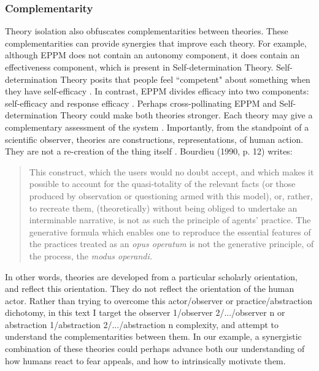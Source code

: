 \documentclass[12 pt]{article}
\begin{document}
 \subsubsection{Complementarity} 
Theory isolation also obfuscates complementarities between theories. These complementarities can provide synergies that improve each theory.  For example, although EPPM does not contain an autonomy component, it does contain an effectiveness component, which is present in Self-determination Theory. Self-determination Theory posits that people feel ``competent" about something when they have self-efficacy \parencite{Ryan2000}. In contrast, EPPM divides efficacy into two components: self-efficacy and response efficacy \parencite{Maloney2011}. Perhaps cross-pollinating EPPM and Self-determination Theory could make both theories stronger. Each theory may give a complementary assessment of the system \parencite{Weinberg2001}. Importantly, from the standpoint of a scientific observer, theories are constructions, representations, of human action. They are not a re-creation of the thing itself \parencite{Kaplan1964, Bourdieu1990}. Bourdieu (1990,  p. 12) writes: \blockquote{This construct, which the users would no doubt accept, and which makes it possible to account for the quasi-totality of the relevant facts (or those produced by observation or questioning armed with this model), or, rather, to recreate them, (theoretically) without being obliged to undertake an interminable narrative, is not as such the principle of agents' practice. The generative formula which enables one to reproduce the essential features of the practices treated as an \textit{opus operatum} is not the generative principle, of the process, the \textit{modus operandi.}}

In other words, theories are developed from a particular scholarly orientation, and reflect this orientation. They do not reflect the orientation of the human actor. Rather than trying to overcome this actor/observer or practice/abstraction  dichotomy, in this text I target the observer 1/observer 2/.../observer n   or abstraction 1/abstraction 2/.../abstraction n complexity, and attempt to understand the complementarities between them. In our example, a synergistic combination of these theories could perhaps advance both our understanding of how humans react to fear appeals, and how to intrinsically motivate them. 
\end{document}
